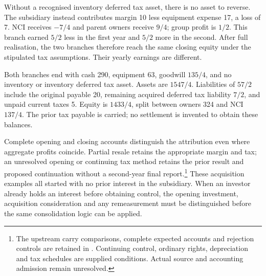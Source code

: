 Without a recognised inventory deferred tax asset, there is no asset to reverse.
The subsidiary instead contributes margin 10 less equipment expense 17, a loss
of 7. NCI receives $-7/4$ and parent owners receive $9/4$; group profit is $1/2$.
This branch earned $5/2$ less in the first year and $5/2$ more in the second.
After full realisation, the two branches therefore reach the same closing
equity under the stipulated tax assumptions. Their yearly earnings are different.

Both branches end with cash 290, equipment 63, goodwill $135/4$, and no inventory
or inventory deferred tax asset. Assets are $1547/4$. Liabilities of $57/2$
include the original payable 20, remaining acquired deferred tax liability
$7/2$, and unpaid current taxes 5. Equity is $1433/4$, split between owners
324 and NCI $137/4$. The prior tax payable is carried; no settlement is
invented to obtain these balances.

Complete opening and closing accounts distinguish the attribution even where
aggregate profits coincide. Partial resale retains the appropriate margin and
tax; an unresolved opening or continuing tax method retains the prior result
and proposed continuation without a second-year final report.\footnote{The
upstream carry comparisons, complete expected accounts and rejection controls
are retained in
.
Continuing control, ordinary rights, depreciation and tax schedules are supplied
conditions. Actual source and accounting admission remain unresolved.}
These acquisition examples all started with no prior interest in the subsidiary.
When an investor already holds an interest before obtaining control, the
opening investment, acquisition consideration and any remeasurement must be
distinguished before the same consolidation logic can be applied.
